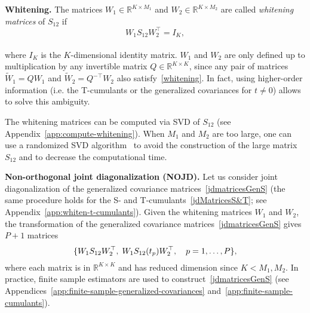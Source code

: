 \documentclass{article}
\newcommand{\ppp}{\textbf}
\newcommand{\zero}{0}
\newcommand{\wt}[1]{\widetilde{#1}}
\newcommand{\R}{\mathbb{R}}
\begin{document}
\ppp{Whitening.}
The matrices $W_1\in\R^{K\times M_1}$ and $W_2\in\R^{K\times M_2}$ are called \emph{whitening matrices} of $S_{12}$ if
\\[-0.9em]
\begin{equation}\label{whitening}
W_1 S_{12} W_2^{\top} = I_K,
\end{equation}
\\[-1.4em]
where $I_K$ is the $K$-dimensional identity matrix. 
 $W_1$ and $W_2$ are only defined up to multiplication by any invertible matrix $Q\in\R^{K\times K}$, since any pair of matrices $\wt{W}_1=Q W_1$ and $\wt{W}_2 = Q^{-\top} W_2$ also satisfy~\eqref{whitening}. In fact, using higher-order information (i.e. the T-cumulants or the generalized covariances for $t\ne\zero$) allows to solve this ambiguity. 

The whitening matrices can be computed via SVD of $S_{12}$ (see Appendix~\ref{app:compute-whitening}).
When $M_1$ and $M_2$ are too large, one can use a randomized SVD algorithm~\citep[see, e.g.,][]{HalEtAl2011} to avoid the construction of the large matrix $S_{12}$ and to decrease the computational time. 


\ppp{Non-orthogonal joint diagonalization (NOJD).}
Let us consider joint diagonalization of the generalized covariance matrices~\eqref{jdmatricesGenS} (the same procedure holds for the S- and T-cumulants~\eqref{jdMatricesS&T}; see Appendix~\ref{app:whiten-t-cumulants}).
Given the whitening matrices $W_1$ and $W_2$, 
the transformation of the generalized covariance matrices~\eqref{jdmatricesGenS} gives $P+1$ matrices
\vspace{-.4em}
\begin{equation}\label{jdmatricesGenSwhitened}
\{W_1S_{12} W_2^{\top}, \; W_1S_{12}(t_p)W_2^{\top}, \quad p=1,\dots,P \},
\vspace{-.4em}
\end{equation}
where each matrix is in $\R^{K\times K}$ and has reduced dimension since $K<M_1,M_2$. In practice, finite sample estimators are used to construct~\eqref{jdmatricesGenS} (see Appendices~\ref{app:finite-sample-generalized-covariances} and~\ref{app:finite-sample-cumulants}).
\end{document}
